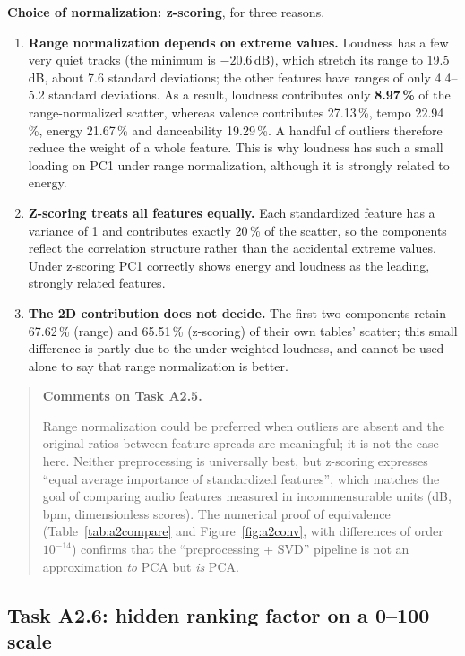 \documentclass[11pt,letterpaper]{article}
\newenvironment{taskcomments}[1][Comments]{%
  \par\medskip\noindent
  \begin{quote}\small\textbf{#1.}\enspace\ignorespaces
}{%
  \end{quote}\medskip
}
\begin{document}
\textbf{Choice of normalization: z-scoring}, for three reasons.
\begin{enumerate}
  \item \textbf{Range normalization depends on extreme values.} Loudness has
        a few very quiet tracks (the minimum is $-20.6$\,dB), which stretch
        its range to 19.5\,dB, about 7.6 standard deviations; the other
        features have ranges of only 4.4--5.2 standard deviations. As a
        result, loudness contributes only \textbf{8.97\,\%} of the
        range-normalized scatter, whereas valence contributes 27.13\,\%,
        tempo 22.94\,\%, energy 21.67\,\% and danceability 19.29\,\%. A
        handful of outliers therefore reduce the weight of a whole feature.
        This is why loudness has such a small loading on PC1 under range
        normalization, although it is strongly related to energy.
  \item \textbf{Z-scoring treats all features equally.} Each standardized
        feature has a variance of 1 and contributes exactly 20\,\% of the
        scatter, so the components reflect the correlation structure rather
        than the accidental extreme values. Under z-scoring PC1 correctly
        shows energy and loudness as the leading, strongly related features.
  \item \textbf{The 2D contribution does not decide.} The first two components
        retain 67.62\,\% (range) and 65.51\,\% (z-scoring) of their own
        tables' scatter; this small difference is partly due to the
        under-weighted loudness, and cannot be used alone to say that range
        normalization is better.
\end{enumerate}

\begin{taskcomments}[Comments on Task A2.5]
Range normalization could be preferred when outliers are absent and the
original ratios between feature spreads are meaningful; it is not the case
here. Neither preprocessing is universally best, but z-scoring expresses
``equal average importance of standardized features'', which matches the goal
of comparing audio features measured in incommensurable units (dB, bpm,
dimensionless scores). The numerical proof of equivalence (Table~\ref{tab:a2compare} and
Figure~\ref{fig:a2conv}, with differences of order $10^{-14}$)
confirms that the ``preprocessing + SVD'' pipeline is not an approximation
\emph{to} PCA but \emph{is} PCA.
\end{taskcomments}

\subsection{Task A2.6: hidden ranking factor on a 0--100 scale}\label{sec:a2hidden}
\end{document}
